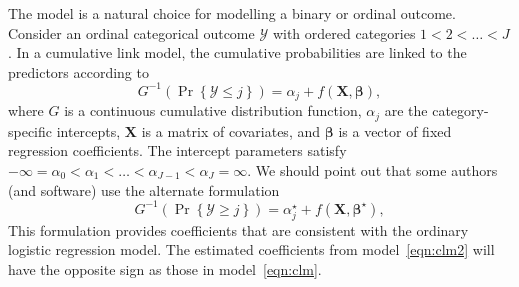 The  model is a natural choice for modelling a binary or ordinal outcome. Consider an ordinal categorical outcome $\mathcal{Y}$ with ordered categories $1 < 2 < \dots < J$. In a cumulative link model, the cumulative probabilities are linked to the predictors according to
\begin{equation}
\label{eqn:clm}
  G^{-1}\left(\Pr\left\{\mathcal{Y} \le j\right\}\right) = \alpha_j + f\left(\boldsymbol{X}, \boldsymbol{\beta}\right),
\end{equation}
where $G$ is a continuous cumulative distribution function, $\alpha_j$ are the category-specific intercepts, $\boldsymbol{X}$ is a matrix of covariates, and $\boldsymbol{\beta}$ is a vector of fixed regression coefficients. The intercept parameters satisfy $-\infty = \alpha_0 < \alpha_1 < \dots < \alpha_{J-1} < \alpha_J = \infty$. We should point out that some authors (and software) use the alternate formulation
\begin{equation}
\label{eqn:clm2}
  G^{-1}\left(\Pr\left\{\mathcal{Y} \ge j\right\}\right) = \alpha_j^\star + f\left(\boldsymbol{X}, \boldsymbol{\beta}^\star\right),
\end{equation}
This formulation provides coefficients that are consistent with the ordinary logistic regression model. The estimated coefficients from model~\eqref{eqn:clm2} will have the opposite sign as those in model~\eqref{eqn:clm}.


